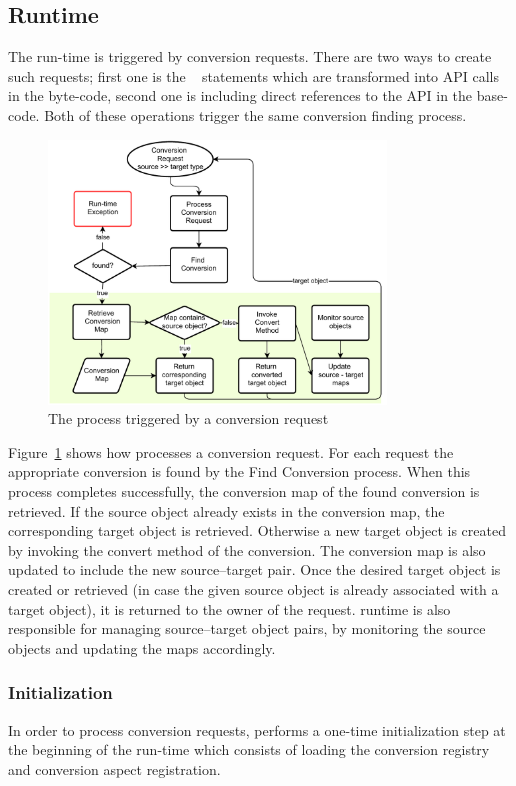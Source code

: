 \subsection{Runtime}
\label{sec:adapter:runtime}
The \zamk run-time is triggered by conversion requests.
There are two ways to create such requests; first one is the \gluer~ statements which are transformed into \zamk API calls in the byte-code, second one is including direct references to the \zamk API in the base-code. 
Both of these operations trigger the same conversion finding process. 
\begin{figure}
\centering
 \includegraphics[width=0.8\textwidth]{chapteradapters/runtime2.pdf}
 \caption{The process triggered by a conversion request}
\label{fig:runtime}
\end{figure}

Figure~\ref{fig:runtime} shows how \zamk processes a conversion request. 
For each request the appropriate conversion is found by the \textsf{Find Conversion} process. 
When this process completes successfully, the conversion map of the found conversion is retrieved. 
If the source object already exists in the conversion map, the corresponding target object is retrieved. 
Otherwise a new target object is created by invoking the convert method of the conversion. 
The conversion map is also updated to include the new source--target pair.
Once the desired target object is created or retrieved (in case the given source object is already associated with a target object), it is returned to the owner of the request. 
\zamk runtime is also responsible for managing source--target object pairs, by monitoring the source objects and updating the maps accordingly.

\subsubsection{Initialization}
\label{sec:adapter:loadconvreg}
In order to process conversion requests, \zamk performs a one-time initialization step at the beginning of the run-time which consists of loading the conversion registry and conversion aspect registration. 

